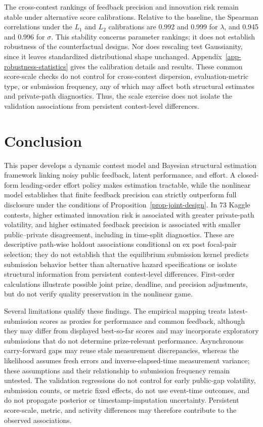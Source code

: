 \documentclass[mnsc]{informs3}
\begin{document}
The cross-contest rankings of feedback precision and innovation risk remain stable under alternative score calibrations. Relative to the baseline, the Spearman correlations under the $L_1$ and $L_2$ calibrations are 0.992 and 0.999 for $\lambda$, and 0.945 and 0.996 for $\sigma$. This stability concerns parameter rankings; it does not establish robustness of the counterfactual designs. Nor does rescaling test Gaussianity, since it leaves standardized distributional shape unchanged. Appendix~\ref{app-robustness-statistics} gives the calibration details and results.
{These common score-scale checks do not control for cross-contest dispersion, evaluation-metric type, or submission frequency, any of which may affect both structural estimates and private-path diagnostics. Thus, the scale exercise does not isolate the validation associations from persistent contest-level differences.}



\section{Conclusion}

{This paper develops a dynamic contest model and Bayesian structural estimation framework linking noisy public feedback, latent performance, and effort. A closed-form leading-order effort policy makes estimation tractable, while the nonlinear model establishes that finite feedback precision can strictly outperform full disclosure under the conditions of Proposition~\ref{prop-joint-design}. In 73 Kaggle contests, higher estimated innovation risk is associated with greater private-path volatility, and higher estimated feedback precision is associated with smaller public--private disagreement, including in time-split diagnostics. These are descriptive path-wise holdout associations conditional on ex post focal-pair selection; they do not establish that the equilibrium submission kernel predicts submission behavior better than alternative hazard specifications or isolate structural information from persistent contest-level differences. First-order calculations illustrate possible joint prize, deadline, and precision adjustments, but do not verify quality preservation in the nonlinear game.}

{Several limitations qualify these findings. The empirical mapping treats latest-submission scores as proxies for performance and common feedback, although they may differ from displayed best-so-far scores and may incorporate exploratory submissions that do not determine prize-relevant performance. Asynchronous carry-forward gaps may reuse stale measurement discrepancies, whereas the likelihood assumes fresh errors and inverse-elapsed-time measurement variance; these assumptions and their relationship to submission frequency remain untested. The validation regressions do not control for early public-gap volatility, submission counts, or metric fixed effects, do not use event-time outcomes, and do not propagate posterior or timestamp-imputation uncertainty. Persistent score-scale, metric, and activity differences may therefore contribute to the observed associations.}
\end{document}
